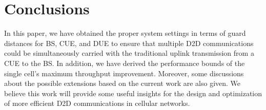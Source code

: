 \documentclass[journal, 10pt]{IEEEtran}
\begin{document}
\section{Conclusions}\label{sec:con} 

In this paper, we have obtained the proper system settings in terms of
guard distances for BS, CUE, and DUE to ensure that multiple D2D
communications could be simultaneously carried with the traditional
uplink transmission from a CUE to the BS. In addition, we have derived
the performance bounds of the single cell's maximum throughput
improvement. Moreover, some discussions about the possible extensions
based on the current work are also given. We believe this work will
provide some useful insights for the design and optimization of more
efficient D2D communications in cellular networks. 



\appendix \label{ap:intersection} 
\end{document}
